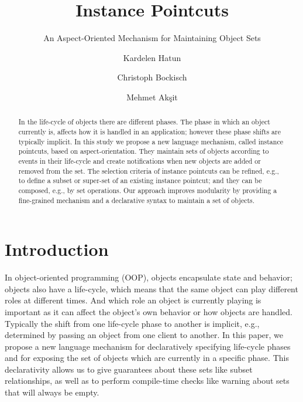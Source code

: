 \documentclass{llncs}
\begin{document}

\title{Instance Pointcuts}
\subtitle{An Aspect-Oriented Mechanism for Maintaining Object Sets}

\author{Kardelen Hatun \and Christoph Bockisch \and Mehmet Ak\c{s}it}

\maketitle

\begin{abstract}
In the life-cycle of objects there are different phases. The phase in which an object currently is, affects how it is handled in an application; however these phase shifts are typically implicit.
In this study we propose a new language mechanism, called instance pointcuts, based on aspect-orientation.
They maintain sets of objects according to events in their life-cycle and create notifications when new objects are added or removed from the set.
The selection criteria of instance pointcuts can be refined, e.g., to define a subset or super-set of an existing instance pointcut; and they can be composed, e.g., by set operations.
Our approach improves modularity by providing a fine-grained mechanism and a declarative syntax to maintain a set of objects.
\end{abstract}

\section{Introduction}
In object-oriented programming (OOP), objects encapsulate state and behavior; objects also have a life-cycle, which means that the same object can play different roles at different times. And which role an object is currently playing is important as it can affect the object's own behavior or how objects are handled. Typically the shift from one life-cycle phase to another is implicit, e.g., determined by passing an object from one client to another. In this paper, we propose a new language mechanism for declaratively specifying life-cycle phases and for exposing the set of objects which are currently in a specific phase. This declarativity allows us to give guarantees about these sets like subset relationships, as well as to perform compile-time checks like warning about sets that will always be empty.
\end{document}
